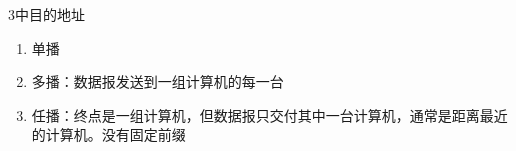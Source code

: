 3中目的地址\begin{enumerate}
    \item 单播
    \item 多播：数据报发送到一组计算机的每一台
    \item 任播：终点是一组计算机，但数据报只交付其中一台计算机，通常是距离最近的计算机。没有固定前缀
\end{enumerate}























































































